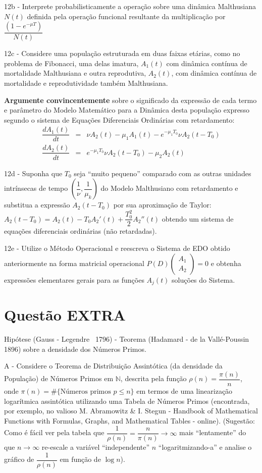     12b - Interprete probabilisticamente a operação sobre uma dinâmica Malthusiana \(N(t)\) definida pela operação funcional resultante da multiplicação por \(\dfrac{(1-e^{-\mu T})}{N(t)}\)

    12c - Considere uma população estruturada em duas faixas etárias, como no problema de Fibonacci, uma delas imatura, \(A_1(t)\) com dinâmica contínua de mortalidade Malthusiana e outra reprodutiva, \(A_2(t)\), com dinâmica contínua de mortalidade e reprodutividade também Malthusiana.

    \textbf{Argumente convincentemente} sobre o significado da expressão de cada termo e parâmetro do Modelo Matemático para a Dinâmica desta população expresso segundo o sistema de Equações Diferenciais Ordinárias com retardamento:
    \[\begin{array}{rcl}
    \dfrac{dA_1(t)}{dt} &=& \nu A_2(t) - \mu_1 A_1(t) - e^{-\mu_1 T_0} \nu A_2(t-T_0) \\[0.3cm]
    \dfrac{dA_2(t)}{dt} &=& e^{-\mu_1 T_0} \nu A_2(t-T_0) - \mu_2 A_2(t)
    \end{array}\]

    12d - Suponha que \(T_0\) seja ``muito pequeno'' comparado com as outras unidades intrínsecas de tempo \(\left(\dfrac{1}{\nu}, \dfrac{1}{\mu_k}\right)\) do Modelo Malthusiano com retardamento e substitua a expressão \(A_2(t-T_0)\) por sua aproximação de Taylor: \(A_2(t-T_0) = A_2(t) - T_0 A_2'(t) + \dfrac{T_0^2}{2} A_2''(t)\) obtendo um sistema de equações diferenciais ordinárias (não retardadas).

    12e - Utilize o Método Operacional e reescreva o Sistema de EDO obtido anteriormente na forma matricial operacional \(P(D) \left(\begin{array}{c} A_1 \\ A_2 \end{array}\right) = 0\) e obtenha expressões elementares gerais para as funções \(A_j(t)\) soluções do Sistema.



\section*{Questão EXTRA}



Hipótese (Gauss - Legendre ~1796) - Teorema (Hadamard - de la Vallé-Poussin 1896) sobre a densidade dos Números Primos.

    A - Considere o Teorema de Distribuição Assintótica (da densidade da População) de Números Primos em \(\mathbb{N}\), descrita pela função \(\rho(n) = \dfrac{\pi(n)}{n}\), onde \(\pi(n) = \# \{\mbox{Números primos } p \le n\}\) em termos de uma linearização logarítmica assintótica utilizando uma Tabela de Números Primos (encontrada, por exemplo, no valioso M. Abramowitz \& I. Stegun - Handbook of Mathematical Functions with Formulas, Graphs, and Mathematical Tables - online). (Sugestão: Como é fácil ver pela tabela que \(\dfrac{1}{\rho(n)} = \dfrac{n}{\pi(n)} \to \infty\) mais ``lentamente'' do que \(n \to \infty\) re-escale a variável ``independente'' \(n\) ``logaritmizando-a'' e analise o gráfico de \(\dfrac{1}{\rho(n)}\) em função de \(\log n\)).

